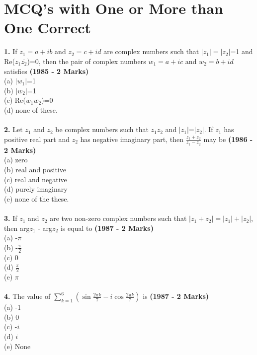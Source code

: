\documentclass[journal,12pt,twocolumn]{IEEEtran}
\theoremstyle{remark}
\begin{document}
\section{ MCQ's with One or More than One Correct}
\textbf{1.} If $z_{1}=a+ib$ and $z_{2}=c+id$ are complex numbers such that $|z_{1}|=|z_{2}|$=1 and Re($z_{1}\overline{z_{2}}$)=0, then the pair of complex numbers $w_{1}=a+ic$ and $w_{2}=b+id$ satisfies \textbf{(1985 - 2 Marks)}\\
(a) $|w_{1}|$=1\\
(b) $|w_{2}|$=1\\
(c) Re($w_{1}\overline{w_{2}}$)=0\\
(d) none of these.\\
\\
\textbf{2.} Let $z_{1}$ and $z_{2}$ be complex numbers such that $z_{1}$\neq$z_{2}$ and $|z_{1}|$=$|z_{2}|$. If $z_{1}$ has positive real part and $z_{2}$ has negative imaginary part, then $\frac{z_{1}+z_{2}}{z_{1}-z_{2}}$ may be \textbf{(1986 - 2 Marks)}\\
(a) zero\\
(b) real and positive\\
(c) real and negative\\
(d) purely imaginary\\
(e) none of the these.\\
\\
\textbf{3.} If $z_{1}$ and $z_{2}$ are two non-zero complex numbers such that $|z_{1}+z_{2}|=|z_{1}|+|z_{2}|$, then arg$z_{1}$ - arg$z_{2}$ is equal to \textbf{(1987 - 2 Marks)}\\
(a) -$\pi$\\
(b) -$\frac{\pi}{2}$\\
(c) 0\\
(d) $\frac{\pi}{2}$\\
(e) $\pi$\\
\\
\textbf{4.} The value of $\sum_{k=1} ^{6} (\sin \frac{2\pi k}{7}-i\cos \frac{2\pi k}{7})$ is \textbf{(1987 - 2 Marks)}\\
(a) -1\\
(b) 0\\
(c) -$i$\\
(d) $i$\\
(e) None\\



\renewcommand{\thefigure}{\theenumi}
\renewcommand{\thetable}{\theenumi}
\end{document}
